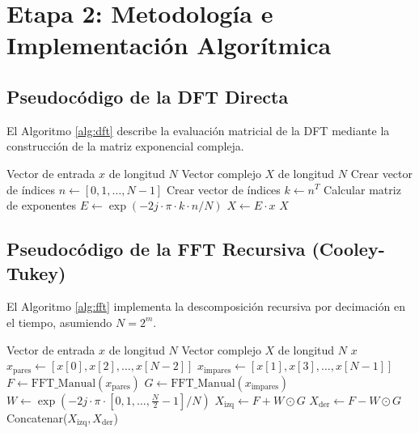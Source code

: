 \documentclass[conference]{IEEEtran}
\begin{document}
\section{Etapa 2: Metodología e Implementación Algorítmica}

\subsection{Pseudocódigo de la DFT Directa}
El Algoritmo \ref{alg:dft} describe la evaluación matricial de la DFT mediante la construcción de la matriz exponencial compleja.

\begin{algorithm}[H]
\caption{Transformada Discreta de Fourier Directa (DFT)}
\label{alg:dft}
\begin{algorithmic}[1]
\REQUIRE Vector de entrada $x$ de longitud $N$
\ENSURE Vector complejo $X$ de longitud $N$
\STATE Crear vector de índices $n \leftarrow [0, 1, \dots, N-1]$
\STATE Crear vector de índices $k \leftarrow n^T$
\STATE Calcular matriz de exponentes $E \leftarrow \exp\left(-2j \cdot \pi \cdot k \cdot n / N\right)$
\STATE $X \leftarrow E \cdot x$ 
\RETURN $X$
\end{algorithmic}
\end{algorithm}

\subsection{Pseudocódigo de la FFT Recursiva (Cooley-Tukey)}
El Algoritmo \ref{alg:fft} implementa la descomposición recursiva por decimación en el tiempo, asumiendo $N = 2^m$.

\begin{algorithm}[H]
\caption{Transformada Rápida de Fourier (FFT Radix-2)}
\label{alg:fft}
\begin{algorithmic}[1]
\REQUIRE Vector de entrada $x$ de longitud $N$
\ENSURE Vector complejo $X$ de longitud $N$
    \RETURN $x$
\ENDIF
\STATE $x_{\text{pares}} \leftarrow [x[0], x[2], \dots, x[N-2]]$
\STATE $x_{\text{impares}} \leftarrow [x[1], x[3], \dots, x[N-1]]$
\STATE $F \leftarrow \text{FFT\_Manual}(x_{\text{pares}})$
\STATE $G \leftarrow \text{FFT\_Manual}(x_{\text{impares}})$
\STATE $W \leftarrow \exp\left(-2j \cdot \pi \cdot [0, 1, \dots, \frac{N}{2}-1] / N\right)$
\STATE $X_{\text{izq}} \leftarrow F + W \odot G$
\STATE $X_{\text{der}} \leftarrow F - W \odot G$
\RETURN Concatenar($X_{\text{izq}}, X_{\text{der}}$)
\end{algorithmic}
\end{algorithm}
\end{document}
